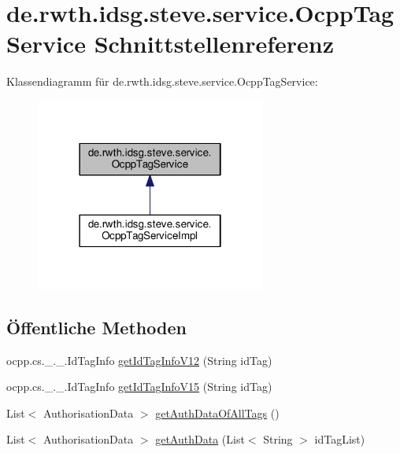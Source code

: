 \hypertarget{interfacede_1_1rwth_1_1idsg_1_1steve_1_1service_1_1_ocpp_tag_service}{\section{de.\-rwth.\-idsg.\-steve.\-service.\-Ocpp\-Tag\-Service Schnittstellenreferenz}
\label{interfacede_1_1rwth_1_1idsg_1_1steve_1_1service_1_1_ocpp_tag_service}
}


Klassendiagramm für de.\-rwth.\-idsg.\-steve.\-service.\-Ocpp\-Tag\-Service\-:\nopagebreak
\begin{figure}[H]
\begin{center}
\leavevmode
\includegraphics[width=214pt]{interfacede_1_1rwth_1_1idsg_1_1steve_1_1service_1_1_ocpp_tag_service__inherit__graph}
\end{center}
\end{figure}
\subsection*{Öffentliche Methoden}
\begin{DoxyCompactItemize}
\item 
ocpp.\-cs.\-\_.\-\_.\-Id\-Tag\-Info \hyperlink{interfacede_1_1rwth_1_1idsg_1_1steve_1_1service_1_1_ocpp_tag_service_a77807256b6d913830669edcc46ec028f}{get\-Id\-Tag\-Info\-V12} (String id\-Tag)
\item 
ocpp.\-cs.\-\_.\-\_.\-Id\-Tag\-Info \hyperlink{interfacede_1_1rwth_1_1idsg_1_1steve_1_1service_1_1_ocpp_tag_service_afe5afe05ed4f072302ed4ed7622dba76}{get\-Id\-Tag\-Info\-V15} (String id\-Tag)
\item 
List$<$ Authorisation\-Data $>$ \hyperlink{interfacede_1_1rwth_1_1idsg_1_1steve_1_1service_1_1_ocpp_tag_service_a669a739e1cbf6aeeacc4ffcb3375991b}{get\-Auth\-Data\-Of\-All\-Tags} ()
\item 
List$<$ Authorisation\-Data $>$ \hyperlink{interfacede_1_1rwth_1_1idsg_1_1steve_1_1service_1_1_ocpp_tag_service_a33a7a5cf778ddd247bab73e5c9f80551}{get\-Auth\-Data} (List$<$ String $>$ id\-Tag\-List)
\end{DoxyCompactItemize}


